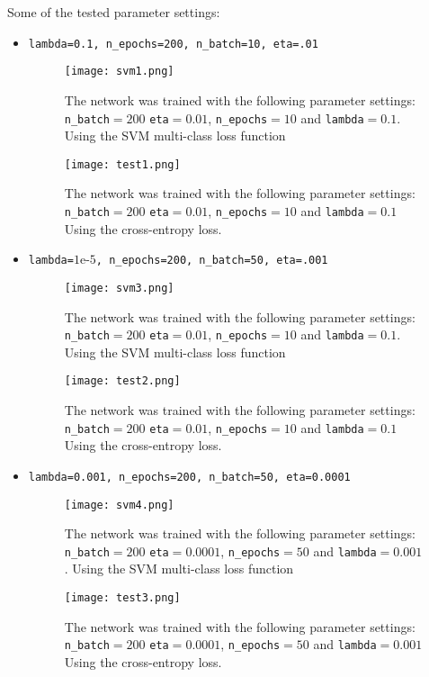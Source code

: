 \documentclass[11pt]{article}
\begin{document}
Some of the tested parameter settings:
 \pagebreak
\begin{itemize}
	\item {\texttt{lambda=0.1, n\_epochs=200, n\_batch=10, eta=.01}}

\begin{figure}[H]
	\centerline{\texttt{[image: svm1.png]}}
	\caption{ The network was trained with the following parameter settings$:$ \texttt{n\_batch}$=200$ \texttt{eta}$=0.01$, \texttt{n\_epochs}$=10$ and  \texttt{lambda}$=0.1$. Using the SVM multi-class loss function}
	\label{fig:1.1}
\end{figure}

\begin{figure}[H]
	\centerline{\texttt{[image: test1.png]}}
	\caption{ The network was trained with the following parameter settings$:$ \texttt{n\_batch}$=200$ \texttt{eta}$=0.01$, \texttt{n\_epochs}$=10$ and  \texttt{lambda}$=0.1$ Using the cross-entropy loss.}
	\label{fig:1.2}
\end{figure}
 \pagebreak
\item {\texttt{lambda=$1\text{e-}5$, n\_epochs=200, n\_batch=50, eta=.001}}

\begin{figure}[H]
	\centerline{\texttt{[image: svm3.png]}}
	\caption{ The network was trained with the following parameter settings$:$ \texttt{n\_batch}$=200$ \texttt{eta}$=0.01$, \texttt{n\_epochs}$=10$ and  \texttt{lambda}$=0.1$. Using the SVM multi-class loss function}
	\label{fig:1.1}
\end{figure}

\begin{figure}[H]
	\centerline{\texttt{[image: test2.png]}}
	\caption{ The network was trained with the following parameter settings$:$ \texttt{n\_batch}$=200$ \texttt{eta}$=0.01$, \texttt{n\_epochs}$=10$ and  \texttt{lambda}$=0.1$ Using the cross-entropy loss.}
	\label{fig:1.6}
\end{figure}
 \pagebreak
\item {\texttt{lambda=0.001, n\_epochs=200, n\_batch=50, eta=0.0001}}

\begin{figure}[H]
	\centerline{\texttt{[image: svm4.png]}}
	\caption{ The network was trained with the following parameter settings$:$ \texttt{n\_batch}$=200$ \texttt{eta}$=0.0001$, \texttt{n\_epochs}$=50$ and  \texttt{lambda}$=0.001$. Using the SVM multi-class loss function}
	\label{fig:1.1}
\end{figure}

\begin{figure}[H]
	\centerline{\texttt{[image: test3.png]}}
	\caption{ The network was trained with the following parameter settings$:$ \texttt{n\_batch}$=200$ \texttt{eta}$=0.0001$, \texttt{n\_epochs}$=50$ and  \texttt{lambda}$=0.001$ Using the cross-entropy loss.}
	\label{fig:1.4}
\end{figure}


\end{itemize}
\end{document}
